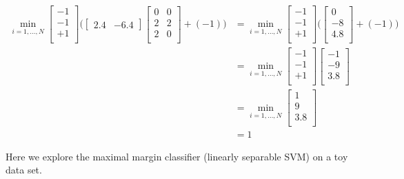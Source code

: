 \documentclass[]{exam} %
\begin{document}
\begin{questions}
\begin{parts}
\begin{align} 
\min_{i=1,\ldots,N} 
\begin{bmatrix}
  -1 \\
  -1 \\
  +1 \\
\end{bmatrix}
 \Big(
\begin{bmatrix} 
  2.4  & -6.4 
\end{bmatrix} 
\begin{bmatrix} 
  0 & 0 \\
  2 & 2 \\
  2 & 0 \\
\end{bmatrix}
+ (-1) \Big)
& = \min_{i=1,\ldots,N} 
\begin{bmatrix}
  -1 \\
  -1 \\
  +1 \\
\end{bmatrix}
 \Big(
\begin{bmatrix} 
  0 \\
  -8 \\
  4.8 \\
\end{bmatrix}
+ (-1) \Big) \\
& = \min_{i=1,\ldots,N} 
\begin{bmatrix}
  -1 \\
  -1 \\
  +1 \\
\end{bmatrix}
\begin{bmatrix} 
  -1 \\
  -9 \\
  3.8 \\
\end{bmatrix} \\
& = \min_{i=1,\ldots,N} 
\begin{bmatrix} 
  1 \\
  9 \\
  3.8 \\
\end{bmatrix} \\
& = 1
\end{align}
\end{parts}
\question Here we explore the maximal margin classifier (linearly separable SVM) on a toy data set.
\end{questions}
\end{document}
